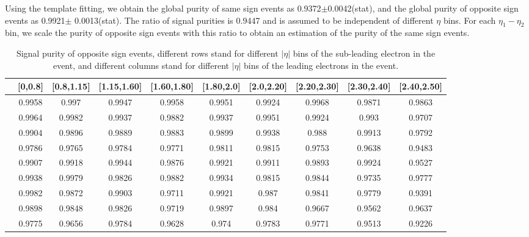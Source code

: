 Using the template fitting, we obtain the global purity of same sign
events as 0.9372$\pm$0.0042(stat), and the global purity of opposite
sign events as 0.9921$\pm$ 0.0013(stat). The ratio of signal purities
is 0.9447 and is assumed to be independent of different $\eta$
bins. For each $\eta_1 - \eta_2$ bin, we scale the purity of opposite
sign events with this ratio to obtain an estimation of the purity of
the same sign events.

\begin{table}
\footnotesize
\centering
\begin{tabular}{c|c|c|c|c|c|c|c|c|c}
  \hline
   &[0,0.8] &[0.8,1.15] &[1.15,1.60] &[1.60,1.80] &[1.80,2.0] &[2.0,2.20] &[2.20,2.30] &[2.30,2.40] &[2.40,2.50] \\
  \hline
  [0,0.8] &0.9958 &0.997 &0.9947 &0.9958 &0.9951 &0.9924 &0.9968 &0.9871 &0.9863 \\
  \hline
  [0.8,1.15] &0.9964 &0.9982 &0.9937 &0.9882 &0.9937 &0.9951 &0.9924 &0.993 &0.9707 \\
  \hline
  [1.15,1.60] &0.9904 &0.9896 &0.9889 &0.9883 &0.9899 &0.9938 &0.988 &0.9913 &0.9792 \\
  \hline
  [1.60,1.80] &0.9786 &0.9765 &0.9784 &0.9771 &0.9811 &0.9815 &0.9753 &0.9638 &0.9483 \\
  \hline
  [1.80,2.0] &0.9907 &0.9918 &0.9944 &0.9876 &0.9921 &0.9911 &0.9893 &0.9924 &0.9527 \\
  \hline
  [2.0,2.20] &0.9938 &0.9979 &0.9826 &0.9882 &0.9934 &0.9815 &0.9844 &0.9735 &0.9777 \\
  \hline
  [2.20,2.30] &0.9982 &0.9872 &0.9903 &0.9711 &0.9921 &0.987 &0.9841 &0.9779 &0.9391 \\
  \hline
  [2.30,2.40] &0.9898 &0.9848 &0.9826 &0.9719 &0.9897 &0.984 &0.9667 &0.9562 &0.9637 \\
  \hline
  [2.40,2.50] &0.9775 &0.9656 &0.9784 &0.9628 &0.974 &0.9783 &0.9771 &0.9513 &0.9226 \\
  \hline
\end{tabular}
\caption{Signal purity of opposite sign events, different rows stand
  for different $|\eta|$ bins of the sub-leading electron in the
  event, and different columns stand for different $|\eta|$ bins of
  the leading electrons in the event.}
\label{tab:fSig Nos}
\end{table}

